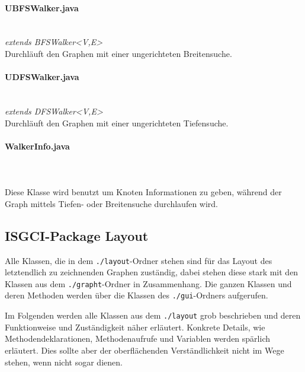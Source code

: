 \documentclass[10pt,a4paper]{article}
\begin{document}
\paragraph{UBFSWalker.java}\ \\
\emph{ extends BFSWalker<V,E>}\\
Durchläuft den Graphen mit einer ungerichteten Breitensuche.\\
\paragraph{UDFSWalker.java}\ \\
\emph{extends DFSWalker<V,E>}\\
Durchläuft den Graphen mit einer ungerichteten Tiefensuche.\\
\paragraph{WalkerInfo.java}\ \\
\emph{}\\
Diese Klasse wird benutzt um Knoten Informationen zu geben, während der Graph mittels Tiefen- oder Breitensuche durchlaufen wird.

\subsection{ISGCI-Package Layout}

Alle Klassen, die in dem \texttt{./layout}-Ordner stehen sind für das Layout des letztendlich zu zeichnenden Graphen zuständig, dabei stehen diese stark mit den Klassen aus dem \texttt{./grapht}-Ordner in Zusammenhang. Die ganzen Klassen und deren Methoden werden über die Klassen des \texttt{./gui}-Ordners aufgerufen.

Im Folgenden werden alle Klassen aus dem \texttt{./layout} grob beschrieben und deren Funktionweise und Zuständigkeit näher erläutert. Konkrete Details, wie Methodendeklarationen, Methodenaufrufe und Variablen werden spärlich erläutert. Dies sollte aber der oberflächenden Verständlichkeit nicht im Wege stehen, wenn nicht sogar dienen.
\end{document}

